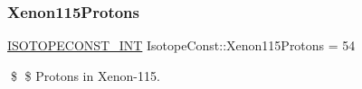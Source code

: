 \subsubsection{\texorpdfstring{Xenon115\+Protons}{Xenon115Protons}}
{\footnotesize\ttfamily \mbox{\hyperlink{group___isotope_const-_macros_ga5f18360b3e99483a35c32d789e62621c}{I\+S\+O\+T\+O\+P\+E\+C\+O\+N\+S\+T\+\_\+\+I\+NT}} Isotope\+Const\+::\+Xenon115\+Protons = 54}

\$ \$ Protons in Xenon-\/115. 